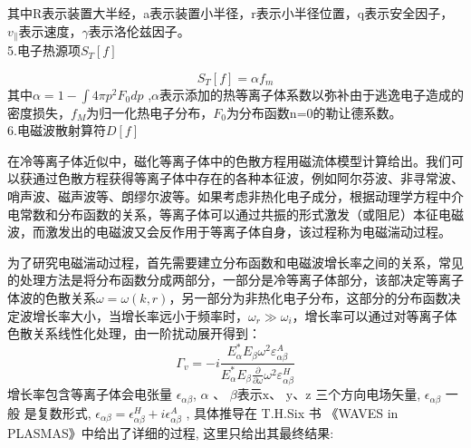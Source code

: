 其中R表示装置大半经，a表示装置小半径，r表示小半径位置，q表示安全因子，$𝑣_{∥}$表示速度，$𝛾$表示洛伦兹因子。\\
5.电子热源项$S_T[f]$\par
\begin{equation}
{S}_T[f]=\alpha f_m
\end{equation}
其中$α=1-∫4πp^2 F_0 dp$ ,$α$表示添加的热等离子体系数以弥补由于逃逸电子造成的密度损失，$f_M$为归一化热电子分布，$F_0$为分布函数n=0的勒让德系数。\\
6.电磁波散射算符$D[f]$\par
在冷等离子体近似中，磁化等离子体中的色散方程用磁流体模型计算给出。我们可以获通过色散方程获得等离子体中存在的各种本征波，例如阿尔芬波、非寻常波、哨声波、磁声波等、朗缪尔波等。如果考虑非热化电子成分，根据动理学方程中介电常数和分布函数的关系，等离子体可以通过共振的形式激发（或阻尼）本征电磁波，而激发出的电磁波又会反作用于等离子体自身，该过程称为电磁湍动过程\cite{胡希伟2006等离子体理论基础}。\par
为了研究电磁湍动过程，首先需要建立分布函数和电磁波增长率之间的关系，常见的处理方法是将分布函数分成两部分，一部分是冷等离子体部分，该部决定等离子体波的色散关系$\omega=\omega(k,r)$，另一部分为非热化电子分布，这部分的分布函数决定波增长率大小，当增长率远小于频率时，$\omega_r≫\omega_i$，增长率可以通过对等离子体色散关系线性化处理，由一阶扰动展开得到\cite{RN1452}：
\begin{equation}\label{eq:gamma}
\Gamma_{v}=-i \frac{E_{\alpha}^{*} E_{\beta} \omega^{2} \varepsilon_{\alpha \beta}^{A}}{E_{\alpha}^{*} E_{\beta} \frac{\partial}{\partial \omega} \omega^{2} \varepsilon_{\alpha \beta}^{H}}
\end{equation}
增长率包含等离子体会电张量  $\epsilon_{\alpha \beta}$, $\alpha$ 、 $\beta$表示$  \mathrm{x} $、 $\mathrm{y} $、$ \mathrm{z} $ 三个方向电场矢量,  $\epsilon_{\alpha \beta} $ 一般 是复数形式, $ \epsilon_{\alpha \beta}=\epsilon_{\alpha \beta}^{H}+i \epsilon_{\alpha \beta}^{A}$ , 具体推导在 T.H.Six 书 《WAVES in PLASMAS》\cite{RN1836}中给出了详细的过程, 这里只给出其最终结果:
